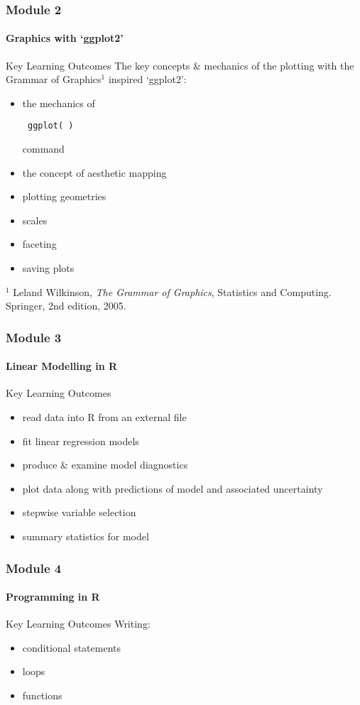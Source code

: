\documentclass[xcolor=dvipsnames]{beamer}
\begin{document}
\begin{frame}[fragile]
\frametitle{Module 2}
\framesubtitle{Graphics with `ggplot2'}
\begin{block}{Key Learning Outcomes}
The key concepts \& mechanics of the plotting with the Grammar of Graphics$^1$ inspired `ggplot2': \begin{itemize}
\item the mechanics of \begin{verbatim} ggplot( ) \end{verbatim} command
\item the concept of aesthetic mapping
\item plotting geometries
\item scales
\item faceting
\item saving plots
\end{itemize}
\end{block}

\tiny $^1$ Leland Wilkinson, \textit{The Grammar of Graphics}, Statistics and Computing. Springer, 2nd edition, 2005.
\end{frame}

\begin{frame}
\frametitle{Module 3}
\framesubtitle{Linear Modelling in R}
\begin{block}{Key Learning Outcomes}
\begin{itemize}
\item read data into R from an external file
\item fit linear regression models
\item produce \& examine model diagnostics
\item plot data along with predictions of model and associated uncertainty
\item stepwise variable selection
\item summary statistics for model
\end{itemize}
\end{block}
\end{frame}

\begin{frame}
\frametitle{Module 4}
\framesubtitle{Programming in R}
\begin{block}{Key Learning Outcomes}
Writing:
\begin{itemize}
\item conditional statements
\item loops
\item functions
\end{itemize}
\end{block}
\end{frame}
\end{document}
